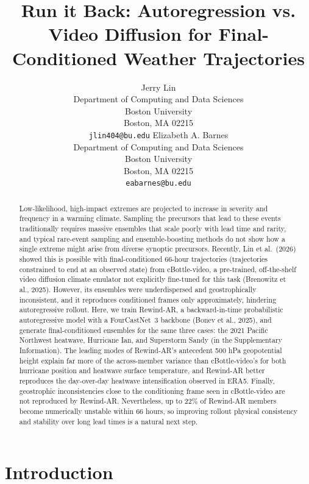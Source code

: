 \documentclass{article}
\title{Run it Back: Autoregression vs. Video Diffusion for Final-Conditioned Weather Trajectories}
\author{Jerry Lin \\
  Department of Computing and Data Sciences \\
  Boston University \\
  Boston, MA 02215 \\
  \texttt{jlin404@bu.edu}
  \And
  Elizabeth A. Barnes \\
  Department of Computing and Data Sciences \\
  Boston University \\
  Boston, MA 02215 \\
  \texttt{eabarnes@bu.edu}
}
\begin{document}
\maketitle

\begin{abstract}

Low-likelihood, high-impact extremes are projected to increase in severity and frequency in a warming climate. Sampling the precursors that lead to these events traditionally requires massive ensembles that scale poorly with lead time and rarity, and typical rare-event sampling and ensemble-boosting methods do not show how a single extreme might arise from diverse synoptic precursors. Recently, Lin et al.\ (2026) showed this is possible with final-conditioned 66-hour trajectories (trajectories constrained to end at an observed state) from cBottle-video, a pre-trained, off-the-shelf video diffusion climate emulator not explicitly fine-tuned for this task (Brenowitz et al., 2025). However, its ensembles were underdispersed and geostrophically inconsistent, and it reproduces conditioned frames only approximately, hindering autoregressive rollout. Here, we train Rewind-AR, a backward-in-time probabilistic autoregressive model with a FourCastNet~3 backbone (Bonev et al., 2025), and generate final-conditioned ensembles for the same three cases: the 2021 Pacific Northwest heatwave, Hurricane Ian, and Superstorm Sandy (in the Supplementary Information). The leading modes of Rewind-AR's antecedent 500 hPa geopotential height explain far more of the across-member variance than cBottle-video's for both hurricane position and heatwave surface temperature, and Rewind-AR better reproduces the day-over-day heatwave intensification observed in ERA5. Finally, geostrophic inconsistencies close to the conditioning frame seen in cBottle-video are not reproduced by Rewind-AR. Nevertheless, up to 22\% of Rewind-AR members become numerically unstable within 66 hours, so improving rollout physical consistency and stability over long lead times is a natural next step.

\end{abstract}

\section{Introduction}
\end{document}
